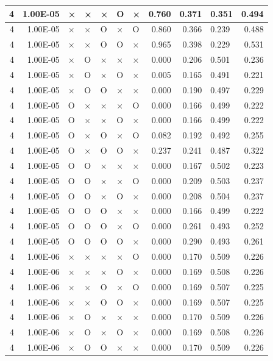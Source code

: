 \documentclass[11pt]{article}
\begin{document}
\begin{longtable}[h]{|r|r|l|l|l|l|l|r|r|l|r|}
4 & 1.00E-05 & × & × & × & O & × & 0.760 & 0.371 & 0.351 & 0.494 \\ \hline
4 & 1.00E-05 & × & × & O & × & O & 0.860 & 0.366 & 0.239 & 0.488 \\ \hline
4 & 1.00E-05 & × & × & O & O & × & 0.965 & 0.398 & 0.229 & 0.531 \\ \hline
4 & 1.00E-05 & × & O & × & × & × & 0.000 & 0.206 & 0.501 & 0.236 \\ \hline
4 & 1.00E-05 & × & O & × & O & × & 0.005 & 0.165 & 0.491 & 0.221 \\ \hline
4 & 1.00E-05 & × & O & O & × & × & 0.000 & 0.190 & 0.497 & 0.229 \\ \hline
4 & 1.00E-05 & O & × & × & × & O & 0.000 & 0.166 & 0.499 & 0.222 \\ \hline
4 & 1.00E-05 & O & × & × & O & × & 0.000 & 0.166 & 0.499 & 0.222 \\ \hline
4 & 1.00E-05 & O & × & O & × & O & 0.082 & 0.192 & 0.492 & 0.255 \\ \hline
4 & 1.00E-05 & O & × & O & O & × & 0.237 & 0.241 & 0.487 & 0.322 \\ \hline
4 & 1.00E-05 & O & O & × & × & × & 0.000 & 0.167 & 0.502 & 0.223 \\ \hline
4 & 1.00E-05 & O & O & × & × & O & 0.000 & 0.209 & 0.503 & 0.237 \\ \hline
4 & 1.00E-05 & O & O & × & O & × & 0.000 & 0.208 & 0.504 & 0.237 \\ \hline
4 & 1.00E-05 & O & O & O & × & × & 0.000 & 0.166 & 0.499 & 0.222 \\ \hline
4 & 1.00E-05 & O & O & O & × & O & 0.000 & 0.261 & 0.493 & 0.252 \\ \hline
4 & 1.00E-05 & O & O & O & O & × & 0.000 & 0.290 & 0.493 & 0.261 \\ \hline
4 & 1.00E-06 & × & × & × & × & O & 0.000 & 0.170 & 0.509 & 0.226 \\ \hline
4 & 1.00E-06 & × & × & × & O & × & 0.000 & 0.169 & 0.508 & 0.226 \\ \hline
4 & 1.00E-06 & × & × & O & × & O & 0.000 & 0.169 & 0.507 & 0.225 \\ \hline
4 & 1.00E-06 & × & × & O & O & × & 0.000 & 0.169 & 0.507 & 0.225 \\ \hline
4 & 1.00E-06 & × & O & × & × & × & 0.000 & 0.170 & 0.509 & 0.226 \\ \hline
4 & 1.00E-06 & × & O & × & O & × & 0.000 & 0.169 & 0.508 & 0.226 \\ \hline
4 & 1.00E-06 & × & O & O & × & × & 0.000 & 0.170 & 0.509 & 0.226 \\ \hline

\end{longtable}
\end{document}
